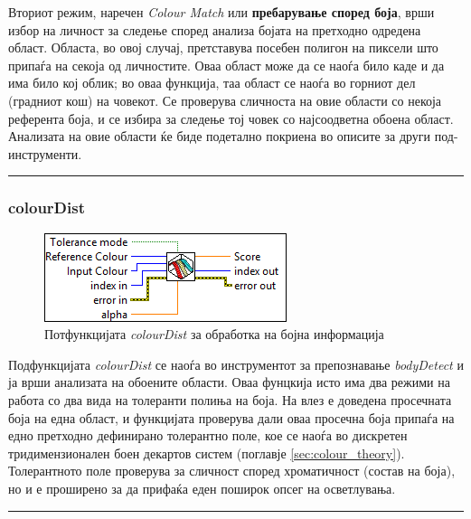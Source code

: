 \documentclass[12pt]{article}
\begin{document}
      Вториот режим, наречен \textit{Colour Match} или \textbf{пребарување според боја}, врши избор на личност за следење според анализа бојата на претходно одредена област. Областа, во овој случај, претставува посебен полигон на пиксели што припаѓа на секоја од личностите. Оваа област може да се наоѓа било каде и да има било кој облик; во оваа функција, таа област се наоѓа во горниот дел (градниот кош) на човекот. Се проверува сличноста на овие области со некоја референта боја, и се избира за следење тој човек со најсоодветна обоена област. Анализата на овие области ќе биде подетално покриена во описите за други под-инструменти.\\
      \textcolor[RGB]{150,150,150}{\rule{\linewidth}{1.6pt}}

    \subsubsection{colourDist}
	    \begin{figure}[H]
	      \includegraphics[width=0.55\linewidth]{./images/colourDist_border.png}
		    \caption{Потфункцијата \textit{colourDist} за обработка на бојна информација}
	      \label{fig:colourDist.png}
	      \raggedright
	      \end{figure}
      Подфункцијата \textit{colourDist} се наоѓа во инструментот за препознавање \textit{bodyDetect} и ја врши анализата на обоените области. Оваа фунцкија исто има два режими на работа со два вида на толеранти полиња на боја. На влез е доведена просечната боја на една област, и функцијата проверува дали оваа просечна боја припаѓа на едно претходно дефинирано толерантно поле, кое се наоѓа во дискретен тридимензионален боен декартов систем (поглавје \ref{sec:colour_theory}). Толерантното поле проверува за сличност според хроматичност (состав на боја), но и е проширено за да прифаќа еден поширок опсег на осветлувања.\\
      \textcolor[RGB]{150,150,150}{\rule{\linewidth}{1.6pt}}
\end{document}

